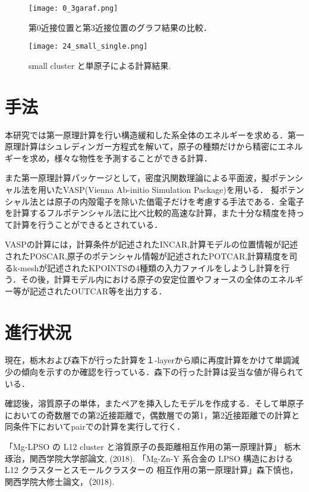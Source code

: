 \documentclass[a4j,twocolumn]{jsarticle}
\begin{document}
\begin{figure}[h]
\vspace{0\baselineskip}
\begin{center}
   \texttt{[image: 0\_3garaf.png]}
  \caption{第0近接位置と第3近接位置のグラフ結果の比較\cite{tochigi}．\label{glaf}}
  \label{fig:one}
\end{center}
\end{figure}

\begin{figure}[h]
\vspace{0\baselineskip}
\begin{center}
   \texttt{[image: 24\_small\_single.png]}
  \caption{small cluster と単原子による計算結果\cite{tochigi}. \label{glaf}}
  \label{fig:two}
\end{center}
\end{figure}



\section{手法}

本研究では第一原理計算を行い構造緩和した系全体のエネルギーを求める．第一原理計算はシュレディンガー方程式を解いて，原子の種類だけから精密にエネルギーを求め，様々な物性を予測することができる計算．

また第一原理計算パッケージとして，密度汎関数理論による平面波，擬ポテンシャル法を用いたVASP(Vienna Ab-initio Simulation Package)を用いる．
擬ポテンシャル法とは原子の内殻電子を除いた価電子だけを考慮する手法である．全電子を計算するフルポテンシャル法に比べ比較的高速な計算，また十分な精度を持って計算を行うことができるとされている．

VASPの計算には，計算条件が記述されたINCAR,計算モデルの位置情報が記述されたPOSCAR,原子のポテンシャル情報が記述されたPOTCAR,計算精度を司るk-meshが記述されたKPOINTSの4種類の入力ファイルをしようし計算を行う．その後，計算モデル内における原子の安定位置やフォースの全体のエネルギー等が記述されたOUTCAR等を出力する．

\section{進行状況}
現在，栃木および森下が行った計算を１-layerから順に再度計算をかけて単調減少の傾向を示すのか確認を行っている．森下の行った計算は妥当な値が得られている．

確認後，溶質原子の単体，またペアを挿入したモデルを作成する．そして単原子においての奇数層での第2近接距離で，偶数層での第1，第2近接距離での計算と同条件下においてpairでの計算を実行して行く．

\vspace{0.5\baselineskip}

{\small\setlength\baselineskip{10pt}	%
\begin{thebibliography}{9}
「Mg-LPSO の L12 cluster と溶質原子の長距離相互作用の第一原理計算」 栃木琢治，関西学院大学部論文, (2018).
 「Mg-Zn-Y 系合金の LPSO 構造における L12 クラスターとスモールクラスターの 相互作用の第一原理計算」森下慎也，関西学院大修士論文，（2018).

\end{thebibliography}
}
\end{document}
